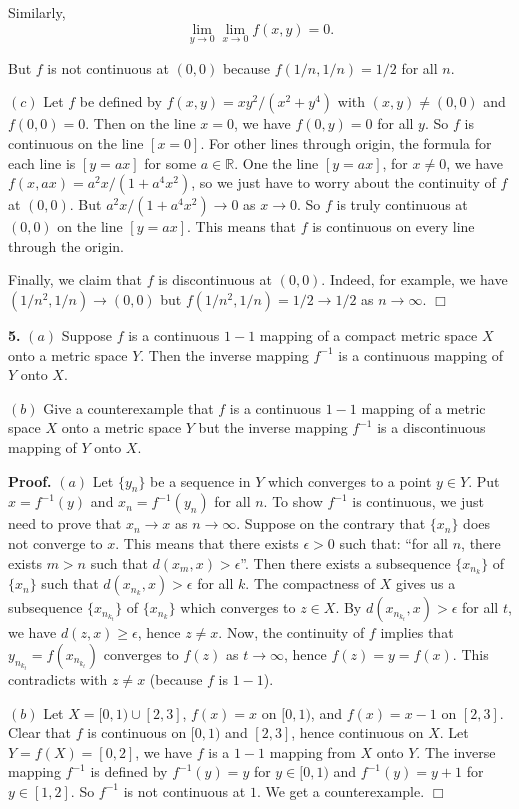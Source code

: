 \documentclass{article}
\begin{document}
Similarly, \[ \lim_{y\to 0}\lim_{x\to 0} f(x,y) = 0.\]

But $f$ is not continuous at $(0,0)$ because $f(1/n,1/n) = 1/2$ for all
$n$.

$(c)$ Let $f$ be defined by $f(x,y) = xy^2/(x^2+y^4)$ with
$(x,y)\ne (0,0)$ and $f(0,0) = 0$. Then on the line $x = 0$, we have
$f(0,y) = 0$ for all $y$. So $f$ is continuous on the line $[x=0]$. For
other lines through origin, the formula for each line is $[y = ax]$ for
some $a\in \mathbb{R}$. One the line $[y=ax]$, for $x\ne 0$, we have
$f(x,ax) = a^2x/(1+ a^4x^2)$, so we just have to worry about the
continuity of $f$ at $(0,0)$. But $a^2x/(1+ a^4x^2) \to 0$ as $x \to 0$.
So $f$ is truly continuous at $(0,0)$ on the line $[y=ax]$. This means
that $f$ is continuous on every line through the origin.

Finally, we claim that $f$ is discontinuous at $(0,0)$. Indeed, for
example, we have $(1/n^2,1/n)\to (0,0)$ but $f(1/n^2,1/n) = 1/2 \to 1/2$
as $n\to \infty$. $\Box$

    \textbf{5.} $(a)$ Suppose $f$ is a continuous $1-1$ mapping of a compact
metric space $X$ onto a metric space $Y$. Then the inverse mapping
$f^{-1}$ is a continuous mapping of $Y$ onto $X$.

$(b)$ Give a counterexample that $f$ is a continuous $1-1$ mapping of a
metric space $X$ onto a metric space $Y$ but the inverse mapping
$f^{-1}$ is a discontinuous mapping of $Y$ onto $X$.

\textbf{Proof.} $(a)$ Let $\{y_n\}$ be a sequence in $Y$ which converges
to a point $y\in Y$. Put $x=f^{-1}(y)$ and $x_n = f^{-1}(y_n)$ for all
$n$. To show $f^{-1}$ is continuous, we just need to prove that
$x_n \to x$ as $n\to \infty$. Suppose on the contrary that $\{x_n\}$
does not converge to $x$. This means that there exists $\epsilon > 0$
such that: ``for all $n$, there exists $m > n$ such that
$d(x_m,x) > \epsilon$''. Then there exists a subsequence $\{x_{n_k}\}$
of $\{x_n\}$ such that $d(x_{n_k},x) > \epsilon$ for all $k$. The
compactness of $X$ gives us a subsequence $\{x_{n_{k_t}}\}$ of
$\{x_{n_k}\}$ which converges to $z\in X$. By
$d(x_{n_{k_t}},x) > \epsilon$ for all $t$, we have
$d(z,x) \ge \epsilon$, hence $z\ne x$. Now, the continuity of $f$
implies that $y_{n_{k_t}}= f(x_{n_{k_t}})$ converges to $f(z)$ as
$t\to \infty$, hence $f(z) = y = f(x)$. This contradicts with $z\ne x$
(because $f$ is $1-1$).

$(b)$ Let $X = [0,1) \cup [2,3]$, $f(x) = x$ on $[0,1)$, and
$f(x) = x-1$ on $[2,3]$. Clear that $f$ is continuous on $[0,1)$ and
$[2,3]$, hence continuous on $X$. Let $Y = f(X) = [0,2]$, we have $f$ is
a $1-1$ mapping from $X$ onto $Y$. The inverse mapping $f^{-1}$ is
defined by $f^{-1}(y) = y$ for $y \in [0,1)$ and $f^{-1}(y) = y+1$ for
$y\in [1,2]$. So $f^{-1}$ is not continuous at $1$. We get a
counterexample. $\Box$
\end{document}
